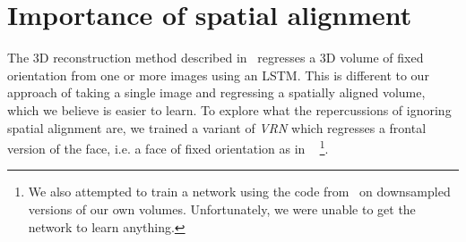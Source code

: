 





\section{Importance of spatial alignment}
\label{sec:spatialimportance}

  The 3D reconstruction method described
  in~\cite{choy20163d} regresses a 3D volume of fixed orientation from one or more images
  using an LSTM. This is different to our approach of taking a single
  image and regressing a spatially aligned volume, which we believe is
  easier to learn. To explore what the repercussions of ignoring spatial alignment are, we trained a variant of \textit{VRN} which regresses a frontal version of the face, i.e. a face of fixed orientation as in ~\cite{choy20163d} \footnote{ We also attempted to train a network using the code
  from~\cite{choy20163d} on downsampled versions of our own
  volumes. Unfortunately, we were unable to get the network to learn anything.}.

